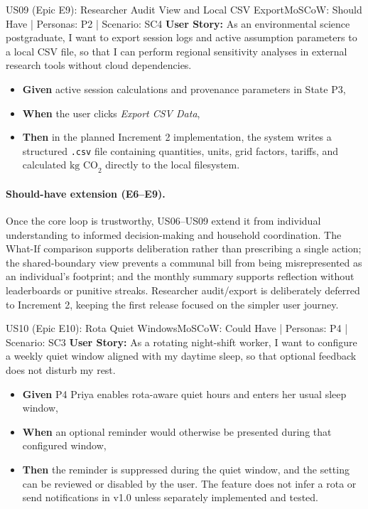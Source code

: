 \documentclass[12pt,a4paper]{article}
\begin{document}
\begin{storybox}{US09 (Epic E9): Researcher Audit View and Local CSV Export}{MoSCoW: Should Have | Personas: P2 | Scenario: SC4}
\textbf{User Story:} As an environmental science postgraduate, I want to export session logs and active assumption parameters to a local CSV file, so that I can perform regional sensitivity analyses in external research tools without cloud dependencies.
\begin{itemize}
    \item \textbf{Given} active session calculations and provenance parameters in State P3,
    \item \textbf{When} the user clicks \textit{Export CSV Data},
    \item \textbf{Then} in the planned Increment 2 implementation, the system writes a structured \texttt{.csv} file containing quantities, units, grid factors, tariffs, and calculated $\text{kg CO}_2$ directly to the local filesystem.
\end{itemize}
\end{storybox}

\paragraph{Should-have extension (E6--E9).}
Once the core loop is trustworthy, US06--US09 extend it from individual understanding to informed decision-making and household coordination. The What-If comparison supports deliberation rather than prescribing a single action; the shared-boundary view prevents a communal bill from being misrepresented as an individual's footprint; and the monthly summary supports reflection without leaderboards or punitive streaks. Researcher audit/export is deliberately deferred to Increment 2, keeping the first release focused on the simpler user journey.

\begin{storybox}{US10 (Epic E10): Rota Quiet Windows}{MoSCoW: Could Have | Personas: P4 | Scenario: SC3}
\textbf{User Story:} As a rotating night-shift worker, I want to configure a weekly quiet window aligned with my daytime sleep, so that optional feedback does not disturb my rest.
\begin{itemize}
    \item \textbf{Given} P4 Priya enables rota-aware quiet hours and enters her usual sleep window,
    \item \textbf{When} an optional reminder would otherwise be presented during that configured window,
    \item \textbf{Then} the reminder is suppressed during the quiet window, and the setting can be reviewed or disabled by the user. The feature does not infer a rota or send notifications in v1.0 unless separately implemented and tested.
\end{itemize}
\end{storybox}
\end{document}
